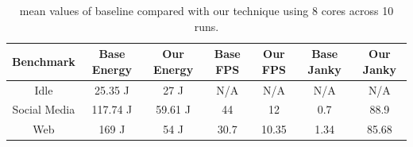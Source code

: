 \documentclass[conference]{IEEEtran}
\begin{document}

%    
%    
% 

\begin{table}
\renewcommand{\arraystretch}{1.3}
\caption{mean values of baseline compared with our technique using 8 cores across 10 runs.}
\label{tab:usecase}
\centering
\begin{tabular}{|c|c|c|c|c|c|c|}
\hline
\textbf{Benchmark} & \textbf{Base Energy} & \textbf{Our Energy} &  \textbf{Base FPS} & \textbf{Our FPS} & \textbf{Base Janky} & \textbf{Our Janky} \\
\hline
      Idle &  25.35 J &  27 J  & N/A & N/A & N/A & N/A \\ 
      Social Media & 117.74 J & 59.61 J & 44 & 12 & 0.7 & 88.9 \\
      Web & 169 J & 54 J & 30.7 & 10.35 & 1.34 & 85.68 \\
      \hline
\end{tabular}

\end{table}
\end{document}
